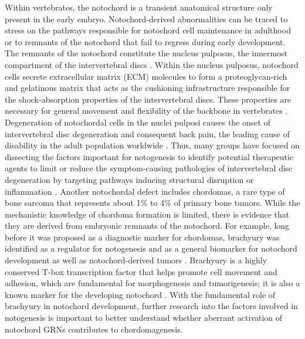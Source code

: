 Within vertebrates, the notochord is a transient anatomical structure only present in the early embryo. Notochord-derived abnormalities can be traced to stress on the pathways responsible for notochord cell maintenance in adulthood or to remnants of the notochord that fail to regress during early development. The remnants of the notochord constitute the nucleus pulposus, the innermost compartment of the intervertebral discs \cite{ghimire2021,debree2018,chesley1935,ang1994,lawson2015}. Within the nucleus pulposus, notochord cells secrete extracellular matrix (ECM) molecules to form a proteoglycan-rich and gelatinous matrix that acts as the cushioning infrastructure responsible for the shock-absorption properties of the intervertebral discs. These properties are necessary for general movement and flexibility of the backbone in vertebrates \cite{ghimire2021,debree2018,lawson2015}. Degeneration of notochordal cells in the nuclei pulposi causes the onset of intervertebral disc degeneration and consequent back pain, the leading cause of disability in the adult population worldwide \cite{mohanty2019,ashley2016,raj2008a,patel2018b,harfe2022,matta2021,kamatani2022,bach2021,purmessur2013}. Thus, many groups have focused on dissecting the factors important for notogenesis to identify potential therapeutic agents to limit or reduce the symptom-causing pathologies of intervertebral disc degeneration by targeting pathways inducing structural disruption or inflammation \cite{harfe2022,matta2021,kamatani2022,bach2021,purmessur2013}. Another notochordal defect includes chordomas, a rare type of bone sarcoma that represents about 1\% to 4\% of primary bone tumors. While the mechanistic knowledge of chordoma formation is limited, there is evidence that they are derived from embryonic remnants of the notochord. For example, long before it was proposed as a diagnostic marker for chordomas, brachyury was identified as a regulator for notogenesis and as a general biomarker for notochord development as well as notochord-derived tumors \cite{bach2021,lawson2015,debree2018,wasserman2018,yeter2019,fujita2016,ulici2021,walcott2012,nibu2013,yakkioui2014,choi2008}. Brachyury is a highly conserved T-box transcription factor that helps promote cell movement and adhesion, which are fundamental for morphogenesis and tumorigenesis; it is also a known marker for the developing notochord \cite{chesley1935,wilkinson1990,yasuo1993,reeves2021,casey1998,conlon2001,barnett1998,corbo1997,chiba2009,jose-edwards2015a,lolas2014,katikala2013,schulte-merker1995,muller1997,matsumoto2007a,passamaneck2009a}. With the fundamental role of brachyury in notochord development, further research into the factors involved in notogenesis is important to better understand whether aberrant activation of notochord GRNs contributes to chordomagenesis.

